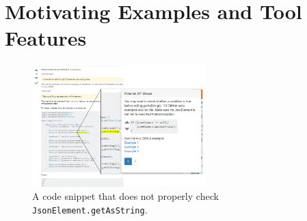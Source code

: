 \section{Motivating Examples and Tool Features}
\label{sec:motivation}
\begin{figure}
\centering
\includegraphics[width=0.6\textwidth]{json_ex1_context.PNG}
  \vspace{.1in}
  \caption{A code snippet that does not properly check {\tt JsonElement.getAsString}.\protect\footnotemark}
  \label{fig:so_example}
\end{figure}

